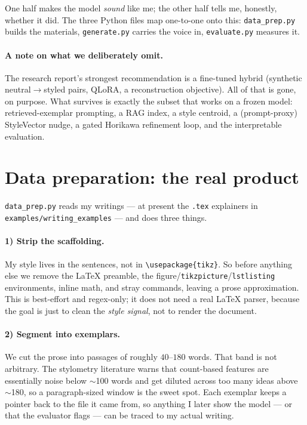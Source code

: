\documentclass[11pt]{article}
\newcommand{\code}[1]{\texttt{#1}}
\begin{document}
One half makes the model \emph{sound} like me; the other half tells me, honestly, whether it did.
The three Python files map one-to-one onto this: \code{data\_prep.py} builds the materials,
\code{generate.py} carries the voice in, \code{evaluate.py} measures it.

\paragraph{A note on what we deliberately omit.} The research report's strongest recommendation is
a fine-tuned hybrid (synthetic neutral$\to$styled pairs, QLoRA, a reconstruction objective). All of
that is gone, on purpose. What survives is exactly the subset that works on a frozen model:
retrieved-exemplar prompting, a RAG index, a style centroid, a (prompt-proxy) StyleVector nudge, a
gated Horikawa refinement loop, and the interpretable evaluation.

\section{Data preparation: the real product}

\code{data\_prep.py} reads my writings --- at present the \code{.tex} explainers in
\code{examples/writing\_examples} --- and does three things.

\paragraph{1) Strip the scaffolding.} My style lives in the sentences, not in
\code{\textbackslash usepackage\{tikz\}}. So before anything else we remove the LaTeX preamble, the
figure/\code{tikzpicture}/\code{lstlisting} environments, inline math, and stray commands, leaving a
prose approximation. This is best-effort and regex-only; it does not need a real LaTeX parser,
because the goal is just to clean the \emph{style signal}, not to render the document.

\paragraph{2) Segment into exemplars.} We cut the prose into passages of roughly $40$--$180$ words.
That band is not arbitrary. The stylometry literature warns that count-based features are essentially
noise below $\sim$100 words and get diluted across too many ideas above $\sim$180, so a
paragraph-sized window is the sweet spot. Each exemplar keeps a pointer back to the file it came
from, so anything I later show the model --- or that the evaluator flags --- can be traced to my
actual writing.
\end{document}
